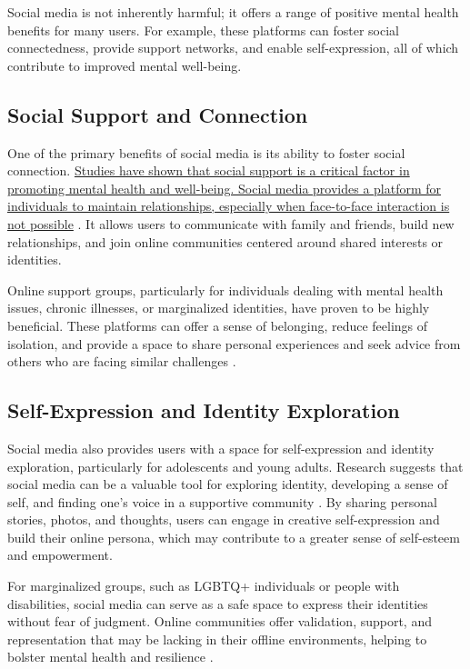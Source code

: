 \documentclass[12pt]{article}
\begin{document}
Social media is not inherently harmful; it offers a range of positive mental health benefits for many users. For example, these platforms can foster social connectedness, provide support networks, and enable self-expression, all of which contribute to improved mental well-being.

\subsection{Social Support and Connection}

One of the primary benefits of social media is its ability to foster social connection. \ul{Studies have shown that social support is a critical factor in promoting mental health and well-being. Social media provides a platform for individuals to maintain relationships, especially when face-to-face interaction is not possible} \cite{hampton2014}. It allows users to communicate with family and friends, build new relationships, and join online communities centered around shared interests or identities.

Online support groups, particularly for individuals dealing with mental health issues, chronic illnesses, or marginalized identities, have proven to be highly beneficial. These platforms can offer a sense of belonging, reduce feelings of isolation, and provide a space to share personal experiences and seek advice from others who are facing similar challenges \cite{lenhart2015}.

\subsection{Self-Expression and Identity Exploration}

Social media also provides users with a space for self-expression and identity exploration, particularly for adolescents and young adults. Research suggests that social media can be a valuable tool for exploring identity, developing a sense of self, and finding one’s voice in a supportive community \cite{valkenburg2006}. By sharing personal stories, photos, and thoughts, users can engage in creative self-expression and build their online persona, which may contribute to a greater sense of self-esteem and empowerment.

For marginalized groups, such as LGBTQ+ individuals or people with disabilities, social media can serve as a safe space to express their identities without fear of judgment. Online communities offer validation, support, and representation that may be lacking in their offline environments, helping to bolster mental health and resilience \cite{lenhart2015}.
\end{document}
